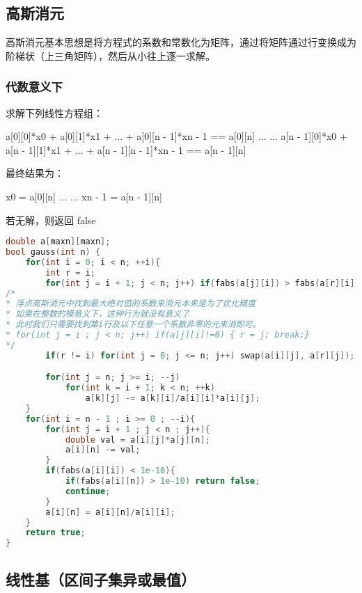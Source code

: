 \subsection{高斯消元}

高斯消元基本思想是将方程式的系数和常数化为矩阵，通过将矩阵通过行变换成为阶梯状（上三角矩阵），然后从小往上逐一求解。

\subsubsection{代数意义下}

求解下列线性方程组：

a[0][0]*x0 + a[0][1]*x1 + ... + a[0][n - 1]*x{n - 1} == a[0][n]
...
...
a[n - 1][0]*x0 + a[n - 1][1]*x1 + ... + a[n - 1][n - 1]*x{n - 1} == a[n - 1][n]

最终结果为：

x0 = a[0][n]
...
...
x{n - 1} = a[n - 1][n]

若无解，则返回 false

\begin{lstlisting}[language=C++]
double a[maxn][maxn];
bool gauss(int n) {
    for(int i = 0; i < n; ++i){
        int r = i;
        for(int j = i + 1; j < n; j++) if(fabs(a[j][i]) > fabs(a[r][i])) r = j;
/*
* 浮点高斯消元中找到最大绝对值的系数来消元本来是为了优化精度
* 如果在整数的模意义下，这种行为就没有意义了
* 此时我们只需要找到第i行及以下任意一个系数非零的元来消即可。
* for(int j = i ; j < n; j++) if(a[j][i]!=0) { r = j; break;}
*/
        if(r != i) for(int j = 0; j <= n; j++) swap(a[i][j], a[r][j]);

        for(int j = n; j >= i; --j)
            for(int k = i + 1; k < n; ++k)
                a[k][j] -= a[k][i]/a[i][i]*a[i][j];
    }
    for(int i = n - 1 ; i >= 0 ; --i){
        for(int j = i + 1 ; j < n ; j++){
            double val = a[i][j]*a[j][n];
            a[i][n] -= val;
        }
        if(fabs(a[i][i]) < 1e-10){
            if(fabs(a[i][n]) > 1e-10) return false;
            continue;
        }
        a[i][n] = a[i][n]/a[i][i];
    }
    return true;
}
\end{lstlisting}

\subsection{线性基（区间子集异或最值）}

